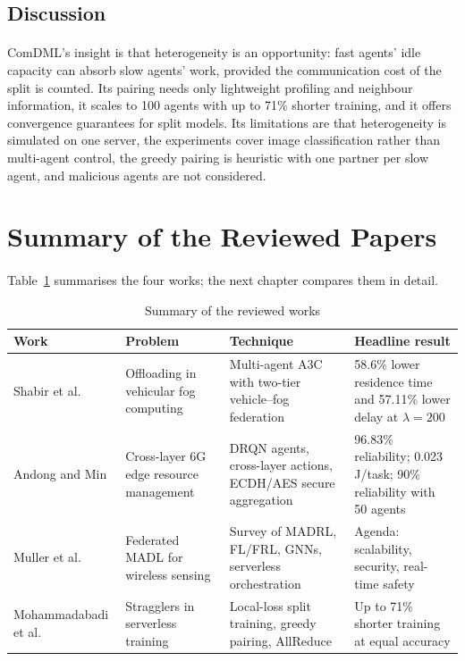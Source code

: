 \documentclass[12pt,a4paper,final]{extreport}
\begin{document}
\subsection{Discussion}

\paragraph{} ComDML's insight is that heterogeneity is an opportunity: fast agents' idle capacity can absorb slow agents' work, provided the communication cost of the split is counted. Its pairing needs only lightweight profiling and neighbour information, it scales to 100 agents with up to 71\% shorter training, and it offers convergence guarantees for split models. Its limitations are that heterogeneity is simulated on one server, the experiments cover image classification rather than multi-agent control, the greedy pairing is heuristic with one partner per slow agent, and malicious agents are not considered.

\section{Summary of the Reviewed Papers}

\paragraph{} Table~\ref{tab:summary} summarises the four works; the next chapter compares them in detail.

{\renewcommand{\arraystretch}{1.15}
\begin{table}[htbp]
\centering
\caption{Summary of the reviewed works}\label{tab:summary}
\small
\begin{tabularx}{\textwidth}{|p{2.25cm}|p{2.6cm}|X|X|}
\hline
\textbf{Work} & \textbf{Problem} & \textbf{Technique} & \textbf{Headline result} \\ \hline
Shabir et al. \cite{p1} & Offloading in vehicular fog computing & Multi-agent A3C with two-tier vehicle--fog federation & 58.6\% lower residence time and 57.11\% lower delay at $\lambda=200$ \\ \hline
Andong and Min \cite{p2} & Cross-layer 6G edge resource management & DRQN agents, cross-layer actions, ECDH/AES secure aggregation & 96.83\% reliability; 0.023 J/task; 90\% reliability with 50 agents \\ \hline
Muller et al. \cite{p3} & Federated MADL for wireless sensing & Survey of MADRL, FL/FRL, GNNs, serverless orchestration & Agenda: scalability, security, real-time safety \\ \hline
Mohammad\-abadi et al. \cite{p4} & Stragglers in serverless training & Local-loss split training, greedy pairing, AllReduce & Up to 71\% shorter training at equal accuracy \\ \hline
\end{tabularx}
\end{table}}
\end{document}
